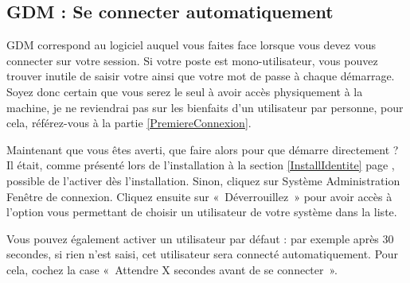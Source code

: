 \subsection{GDM : Se connecter automatiquement}
\label{RefConnexionAuto}
GDM correspond au logiciel auquel vous faites face lorsque vous devez vous connecter sur votre session. Si votre poste est mono-utilisateur, vous pouvez trouver inutile de saisir votre  ainsi que votre mot de passe à chaque démarrage. Soyez donc certain que vous serez le seul à avoir accès physiquement à la machine, je ne reviendrai pas sur les bienfaits d'un utilisateur par personne, pour cela, référez-vous à la partie \ref{PremiereConnexion}.\par
Maintenant que vous êtes averti, que faire alors pour que  démarre directement ?\\
Il était, comme présenté lors de l'installation à la section \ref{InstallIdentite} page \pageref{InstallIdentite}, possible de l'activer dès l'installation. Sinon, cliquez sur Système \FlecheDroite Administration \FlecheDroite Fenêtre de connexion. Cliquez ensuite sur «~Déverrouillez~» pour avoir accès à l'option vous permettant de choisir un utilisateur de votre système dans la liste.\par
Vous pouvez également activer un utilisateur par défaut : par exemple après 30 secondes, si rien n'est saisi, cet utilisateur sera connecté automatiquement. Pour cela, cochez la case «~Attendre X secondes avant de se connecter~».

